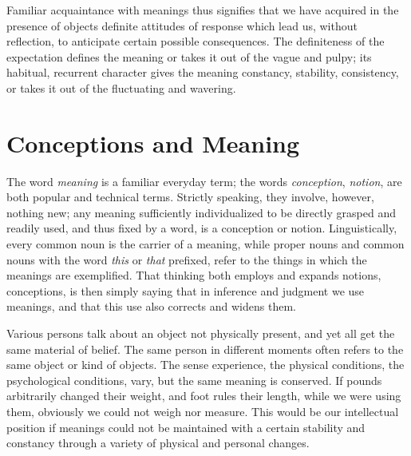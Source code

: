 \documentclass[showtrims,ustradepaper]{memoir}
\begin{document}

Familiar acquaintance with meanings thus signifies that we have acquired
in the presence of objects definite attitudes of response which lead us,
without reflection, to anticipate certain possible consequences. The
definiteness of the expectation defines the meaning or takes it out of
the vague and pulpy; its habitual, recurrent character gives the meaning
constancy, stability, consistency, or takes it out of the fluctuating
and wavering.

\section*{Conceptions and Meaning}


The word \emph{meaning} is a familiar everyday term; the words
\emph{conception}, \emph{notion}, are both popular and technical terms.
Strictly speaking, they involve, however, nothing new; any meaning
sufficiently individualized to be directly grasped and readily used, and
thus fixed by a word, is a conception or notion. Linguistically, every
common noun is the carrier of a meaning, while proper nouns and common
nouns with the word \emph{this} or \emph{that} prefixed, refer to the
things in which the meanings are exemplified. That thinking both employs
and expands notions, conceptions, is then simply saying that in
inference and judgment we use meanings, and that this use also corrects
and widens them.


Various persons talk about an object not physically present, and yet all
get the same material of belief. The same person in different moments
often refers to the same object or kind of objects. The sense
experience, the physical conditions, the psychological conditions, vary,
but the same meaning is conserved. If
pounds
arbitrarily changed their weight, and foot rules their length, while we
were using them, obviously we could not weigh nor measure. This would be
our intellectual position if meanings could not be maintained with a
certain stability and constancy through a variety of physical and
personal changes.



\end{document}
